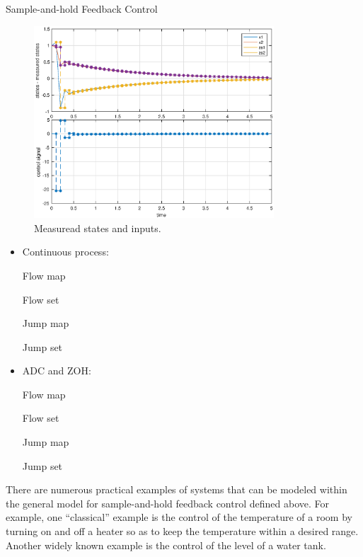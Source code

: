 \begin{example}{Sample-and-hold Feedback Control}
\begin{figure}%
  \begin{center}
    \includegraphics[width=0.8\textwidth]{figures/Simulink/ZOH_exampleResults.eps}
   \caption{Measuread states and inputs.}
\label{fig:ZOH_exampleResults}
  \end{center}
\end{figure}



\begin{itemize}
\item Continuous process:

Flow map
\label{scr:f}

Flow set
\label{scr:C}

Jump map
\label{scr:g}

Jump set
\label{scr:D}
\item ADC and ZOH:

Flow map
\label{scr:f}

Flow set
\label{scr:C}

Jump map
\label{scr:g}

Jump set
\label{scr:D}
\end{itemize}

There are numerous practical examples of systems that can be modeled 
within the general model for sample-and-hold feedback control defined above.
For example, one ``classical'' example is the control of the temperature of a room 
by turning on and off a heater so as to keep the temperature within a desired range.
Another widely known example is the control of the level of a water tank.

\end{example}
